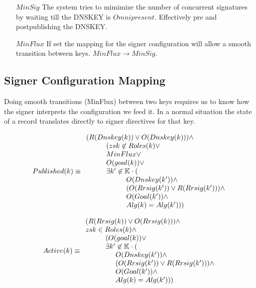 \documentclass[twoside,english, a4paper]{article}
\begin{document}
\begin{itemize}
\item[$MinSig$] The system tries to mimimize the number of concurrent
signatures by waiting till the DNSKEY is $Omnipresent$. Effectively 
pre and postpublishing the DNSKEY.
\item[$MinFlux$] If set the mapping for 
the signer configuration will allow a smooth transition between keys.
$MinFlux \rightarrow MinSig$.
\end{itemize}

\subsection{Signer Configuration Mapping}

Doing smooth transitions (MinFlux) between two keys requires us to 
know how the signer interprets the configuration we feed it. 
In a normal situation the state of a record translates directly to 
signer directives for that key. 

\begin{equation}
Published(k) \equiv 
\begin{array}{l}
\hskip 0.0cm		(R(Dnskey(k)) \vee O(Dnskey(k))) \wedge \\
\hskip 1.0cm		(zsk \not \in Roles(k) \vee \\
\hskip 1.0cm		MinFlux \vee \\
\hskip 1.0cm 		O(goal(k)) \vee \\
\hskip 1.0cm 		\exists k' \not \in \mathbb{K} \cdot (\\
\hskip 2 cm			O(Dnskey(k')) \wedge \\
\hskip 2 cm			(O(Rrsig(k'))\vee R(Rrsig(k'))) \wedge\\
\hskip 2 cm			O(Goal(k')) \wedge\\
\hskip 2 cm			Alg(k)=Alg(k')   ))
\end{array}
\end{equation}

\begin{equation}
Active(k) \equiv 
\begin{array}{l}
\hskip 0.0cm		(R(Rrsig(k)) \vee O(Rrsig(k))) \wedge \\
\hskip 0.0cm		zsk \in Roles(k) \wedge \\
\hskip 1.0cm 		(O(goal(k)) \vee \\
\hskip 1.0cm 		\exists k' \not \in \mathbb{K} \cdot (\\
\hskip 1.5cm			O(Dnskey(k')) \wedge \\
\hskip 1.5cm			(O(Rrsig(k'))\vee R(Rrsig(k'))) \wedge\\
\hskip 1.5cm			O(Goal(k')) \wedge\\
\hskip 1.5cm			Alg(k)=Alg(k')   ))
\end{array}
\end{equation}
\end{document}
